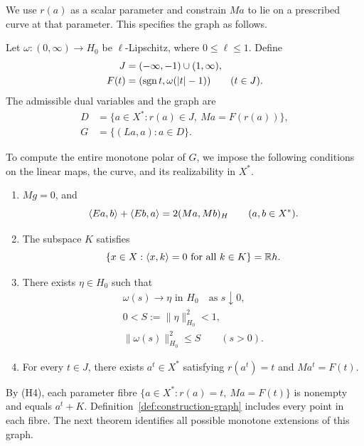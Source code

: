 We use $r(a)$ as a scalar parameter and constrain $Ma$ to lie on a
prescribed curve at that parameter. This specifies the graph as follows.

\begin{definition}
\label{def:construction-graph}
Let $\omega:(0,\infty)\to H_0$ be $\ell$-Lipschitz, where
$0\le\ell\le1$. Define
\[
\begin{aligned}
J&=(-\infty,-1)\cup(1,\infty),\\
F(t)&=(\operatorname{sgn} t,\omega(|t|-1))\qquad(t\in J).
\end{aligned}
\]
The admissible dual variables and the graph are
\begin{equation}
\begin{aligned}
D&=\{a\in X^*:r(a)\in J,\ Ma=F(r(a))\},\\
G&=\{(La,a):a\in D\}.
\end{aligned}
\label{eq:abs-full-graph}
\end{equation}
\end{definition}

To compute the entire monotone polar of $G$, we impose the following
conditions on the linear maps, the curve, and its realizability in $X^*$.
\begin{enumerate}
\item[(H1)] $Mg=0$, and
\begin{equation}
\langle Ea,b\rangle+\langle Eb,a\rangle=2(Ma,Mb)_H
\qquad(a,b\in X^*).
\label{eq:abs-bilinear}
\end{equation}

\item[(H2)] The subspace $K$ satisfies
\begin{equation}
\{x\in X:\langle x,k\rangle=0\ \text{for all }k\in K\}=\mathbb R h.
\label{eq:abs-annihilator}
\end{equation}

\item[(H3)] There exists $\eta\in H_0$ such that
\begin{equation}
\begin{gathered}
\omega(s)\longrightarrow\eta\text{ in }H_0
\quad\text{as }s\downarrow0,\\
0<S:=\|\eta\|_{H_0}^2<1,\\
\|\omega(s)\|_{H_0}^2\le S\qquad(s>0).
\end{gathered}
\label{eq:abs-tail}
\end{equation}

\item[(H4)] For every $t\in J$, there exists $a^t\in X^*$
satisfying $r(a^t)=t$ and $Ma^t=F(t)$.
\end{enumerate}
By \textup{(H4)}, each parameter fibre
$\{a\in X^*:r(a)=t,\ Ma=F(t)\}$ is nonempty and equals $a^t+K$.
Definition~\ref{def:construction-graph} includes every point in each fibre.
The next theorem identifies all possible monotone extensions of this graph.

